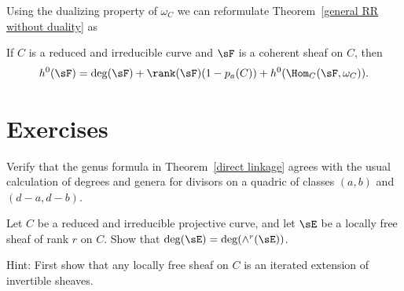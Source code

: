 Using the dualizing property of $\omega_C$ we can reformulate Theorem~\ref{general RR without duality} as
\begin{theorem}\label{general RR with duality}
If $C$ is a reduced and irreducible curve and $\sF$ is a coherent sheaf on $C$, then
$$
h^0(\sF) = \deg(\sF) + \rank(\sF)(1-p_a(C)) + h^0(\Hom_C(\sF, \omega_C)).
$$
\end{theorem}



\section{Exercises}

\begin{exercise}
 Verify that the genus formula in Theorem~\ref{direct linkage} agrees with the usual calculation of degrees and genera for divisors on a quadric of
 classes $(a,b)$ and $(d-a, d-b)$.
\end{exercise}

\begin{exercise}
 Let $C$ be a reduced and irreducible projective curve, and let $\sE$ be a locally free sheaf of rank $r$ on $C$. Show that
 $\deg(\sE) = \deg(\wedge^r(\sE))$.
 
 Hint: First show that any locally free sheaf on $C$ is an iterated extension of invertible sheaves.
\end{exercise}

